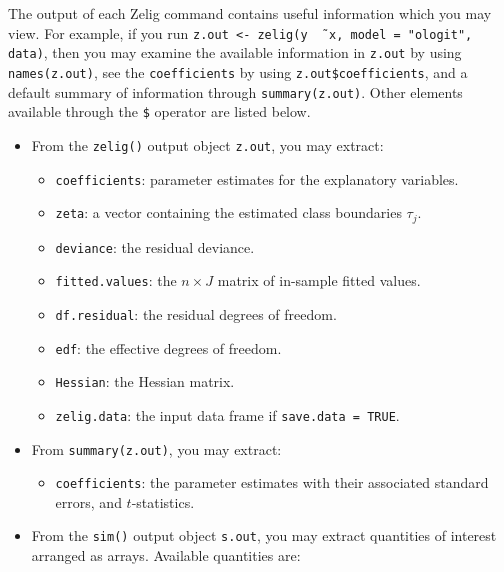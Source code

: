 The output of each Zelig command contains useful information which you
may view.  For example, if you run \texttt{z.out <- zelig(y \~\,
  x, model = "ologit", data)}, then you may examine the available
information in \texttt{z.out} by using \texttt{names(z.out)},
see the {\tt coefficients} by using {\tt z.out\$coefficients}, and
a default summary of information through \texttt{summary(z.out)}.
Other elements available through the {\tt \$} operator are listed
below.

\begin{itemize}
\item From the {\tt zelig()} output object {\tt z.out}, you may
  extract:
   \begin{itemize}
   \item {\tt coefficients}: parameter estimates for the explanatory
     variables.
   \item {\tt zeta}: a vector containing the estimated class
     boundaries $\tau_j$.
   \item {\tt deviance}: the residual deviance.
   \item {\tt fitted.values}: the $n \times J$ matrix of in-sample
     fitted values.
   \item {\tt df.residual}: the residual degrees of freedom.
   \item {\tt edf}: the effective degrees of freedom.  
   \item {\tt Hessian}: the Hessian matrix.
   \item {\tt zelig.data}: the input data frame if {\tt save.data = TRUE}.  
   \end{itemize}

\item From {\tt summary(z.out)}, you may extract: 
   \begin{itemize}
   \item {\tt coefficients}: the parameter estimates with their
     associated standard errors, and $t$-statistics.
   \end{itemize}
   
 \item From the {\tt sim()} output object {\tt s.out}, you may extract
   quantities of interest arranged as arrays.  Available quantities
   are:


\end{itemize}
